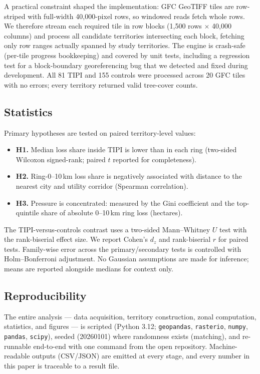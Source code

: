 A practical constraint shaped the implementation: GFC GeoTIFF tiles are row-striped with full-width 40{,}000-pixel rows, so windowed reads fetch whole rows. We therefore stream each required tile in row blocks (1{,}500 rows $\times$ 40{,}000 columns) and process all candidate territories intersecting each block, fetching only row ranges actually spanned by study territories. The engine is crash-safe (per-tile progress bookkeeping) and covered by unit tests, including a regression test for a block-boundary georeferencing bug that we detected and fixed during development. All 81 TIPI and 155 controls were processed across 20 GFC tiles with no errors; every territory returned valid tree-cover counts.

\subsection{Statistics}
Primary hypotheses are tested on paired territory-level values:
\begin{itemize}[leftmargin=1.4em, itemsep=1pt]
\item \textbf{H1.} Median loss share inside TIPI is lower than in each ring (two-sided Wilcoxon signed-rank; paired $t$ reported for completeness).
\item \textbf{H2.} Ring-0--10\,km loss share is negatively associated with distance to the nearest city and utility corridor (Spearman correlation).
\item \textbf{H3.} Pressure is concentrated: measured by the Gini coefficient and the top-quintile share of absolute 0--10\,km ring loss (hectares).
\end{itemize}
The TIPI-versus-controls contrast uses a two-sided Mann--Whitney $U$ test with the rank-biserial effect size. We report Cohen's $d_z$ and rank-biserial $r$ for paired tests. Family-wise error across the primary/secondary tests is controlled with Holm--Bonferroni adjustment. No Gaussian assumptions are made for inference; means are reported alongside medians for context only.

\subsection{Reproducibility}
The entire analysis --- data acquisition, territory construction, zonal computation, statistics, and figures --- is scripted (Python 3.12; \texttt{geopandas}, \texttt{rasterio}, \texttt{numpy}, \texttt{pandas}, \texttt{scipy}), seeded (20260101) where randomness exists (matching), and re-runnable end-to-end with one command from the open repository. Machine-readable outputs (CSV/JSON) are emitted at every stage, and every number in this paper is traceable to a result file.

